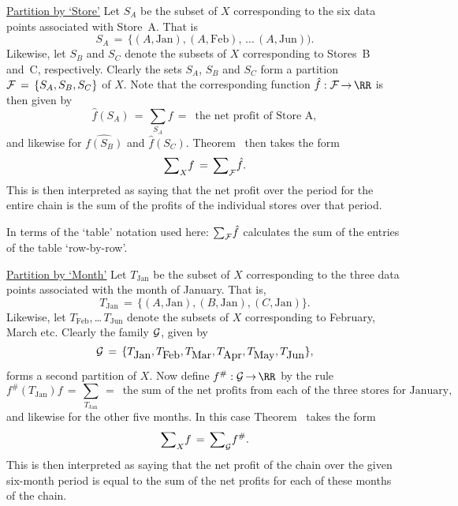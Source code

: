         \underline{Partition by `Store'} Let $S_{A}$ be the subset of $X$  corresponding to the six data points associated with Store~A. That is
        \begin{displaymath}
        S_{A} \,=\, \{(A,\mbox{Jan}), (A,\mbox{Feb}),\,{\ldots}\,(A,\mbox{Jun})).
        \end{displaymath}
    Likewise, let $S_{B}$ and  $S_{C}$ denote the subsets of $X$ corresponding to Stores~B and~C, respectively.
    Clearly the sets $S_{A}$, $S_{B}$ and $S_{C}$ form a partition ${\cal F} \,=\, \{S_{A},S_{B},S_{C}\}$ of $X$.
    Note that the corresponding function $\hat{f}:{\cal F} \,{\rightarrow}\, {\RR}$ is then given by
        \begin{displaymath}
        \hat{f}(S_{A}) \,=\, {\sum}_{S_{A}} f \,=\, \mbox{ the net profit of Store~A},
        \end{displaymath}
    and likewise for $\hat{f(S_{B})}$ and $\hat{f}(S_{C})$.
    Theorem~ then takes the form
        \begin{displaymath}
        {\sum}_{X} f \,=\, {\sum}_{{\cal F}} \hat{f}.
        \end{displaymath}
    This is then interpreted as saying that the net profit over the period for the entire chain is the sum of the profits of the individual stores over that period.

        In terms of the `table' notation used here: ${\sum}_{{\cal F}} \hat{f}$ calculates the sum of the entries of the table `row-by-row'.

\V

        \underline{Partition by `Month'} Let $T_{\mbox{Jan}}$ be the subset of $X$ corresponding to the three data points associated with the month of January.
    That is,
        \begin{displaymath}
        T_{\mbox{Jan}} \,=\, \{(A,\mbox{Jan}), (B,\mbox{Jan}), (C,\mbox{Jan})\}.
        \end{displaymath}
    Likewise, let $T_{\mbox{Feb}}$,\,{\ldots}\,$T_{\mbox{Jun}}$ denote the subsets of $X$ corresponding to February, March etc.
    Clearly the family ${\cal G}$, given by
        \begin{displaymath}
        {\cal G} \,=\, \{T_{\mbox{Jan}}, T_{\mbox{Feb}}, T_{\mbox{Mar}},
        T_{\mbox{Apr}}, T_{\mbox{May}}, T_{\mbox{Jun}}\},
        \end{displaymath}
    forms a second partition of $X$.
    Now define $f^{\#}:{\cal G} \,{\rightarrow}\, {\RR}$ by the rule
        \begin{displaymath}
        f^{\#}(T_{\mbox{Jan}}) f \,=\, {\sum}_{T_{\mbox{Jan}}} \,=\, \mbox{ the sum of the net profits from each of the three stores for January},
        \end{displaymath}
    and likewise for the other five months.
    In this case Theorem~ takes the form
        \begin{displaymath}
        {\sum}_{X} f \,=\, {\sum}_{{\cal G}} f^{\#}.
        \end{displaymath}
    This is then interpreted as saying that the net profit of the chain over the given six-month period is equal to the sum of the net profits for each of these months of the chain.

